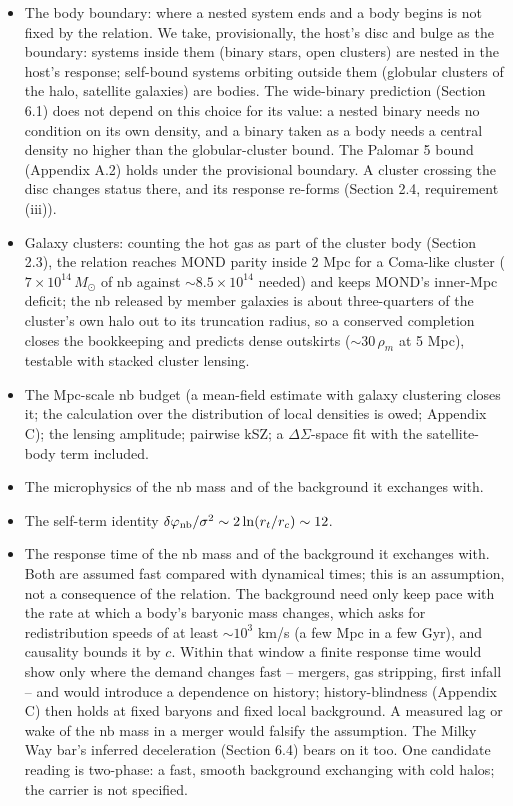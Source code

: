 \documentclass[
  10pt,
]{article}
\begin{document}
\begin{itemize}
\item The body boundary: where a nested system ends and a body begins is not fixed by the relation. We take, provisionally, the host's disc and bulge as the boundary: systems inside them (binary stars, open clusters) are nested in the host's response; self-bound systems orbiting outside them (globular clusters of the halo, satellite galaxies) are bodies. The wide-binary prediction (Section 6.1) does not depend on this choice for its value: a nested binary needs no condition on its own density, and a binary taken as a body needs a central density no higher than the globular-cluster bound. The Palomar 5 bound (Appendix A.2) holds under the provisional boundary. A cluster crossing the disc changes status there, and its response re-forms (Section 2.4, requirement (iii)).
\item Galaxy clusters: counting the hot gas as part of the cluster body (Section 2.3), the relation reaches MOND parity inside 2 Mpc for a Coma-like cluster ($7\times10^{14}\,M_\odot$ of nb against $\sim8.5\times10^{14}$ needed) and keeps MOND's inner-Mpc deficit; the nb released by member galaxies is about three-quarters of the cluster's own halo out to its truncation radius, so a conserved completion closes the bookkeeping and predicts dense outskirts ($\sim30\,\rho_m$ at 5 Mpc), testable with stacked cluster lensing.
\item The Mpc-scale nb budget (a mean-field estimate with galaxy clustering closes it; the calculation over the distribution of local densities is owed; Appendix C); the lensing amplitude; pairwise kSZ; a $\Delta\Sigma$-space fit with the satellite-body term included.
\item The microphysics of the nb mass and of the background it exchanges with.
\item The self-term identity $\delta\varphi_{\rm nb}/\sigma^2\sim 2\ln(r_t/r_c)\sim 12$.
\item The response time of the nb mass and of the background it exchanges with. Both are assumed fast compared with dynamical times; this is an assumption, not a consequence of the relation. The background need only keep pace with the rate at which a body's baryonic mass changes, which asks for redistribution speeds of at least $\sim10^3$ km/s (a few Mpc in a few Gyr), and causality bounds it by $c$. Within that window a finite response time would show only where the demand changes fast -- mergers, gas stripping, first infall -- and would introduce a dependence on history; history-blindness (Appendix C) then holds at fixed baryons and fixed local background. A measured lag or wake of the nb mass in a merger would falsify the assumption. The Milky Way bar's inferred deceleration (Section 6.4) bears on it too. One candidate reading is two-phase: a fast, smooth background exchanging with cold halos; the carrier is not specified.

\end{itemize}
\end{document}
